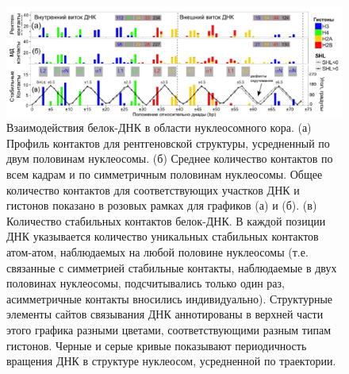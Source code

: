 \begin{figure} [H]
    \centering
    \includegraphics[width=\textwidth]{images/p2/jmb/part2_2_f8.pdf}
    \caption[Взаимодействия белок-ДНК в области нуклеосомного кора]{Взаимодействия белок-ДНК в области нуклеосомного кора. (а) Профиль контактов для рентгеновской структуры, усредненный по двум половинам нуклеосомы. (б) Среднее количество контактов по всем кадрам и по симметричным половинам нуклеосомы. Общее количество контактов для соответствующих участков ДНК и гистонов показано в розовых рамках для графиков (а) и (б). (в) Количество стабильных контактов белок-ДНК. В каждой позиции ДНК указывается количество уникальных стабильных контактов атом-атом, наблюдаемых на любой половине нуклеосомы (т.е. связанные с симметрией стабильные контакты, наблюдаемые в двух половинах нуклеосомы, подсчитывались только один раз, асимметричные контакты вносились индивидуально). Структурные элементы сайтов связывания ДНК аннотированы в верхней части этого графика разными цветами, соответствующими разным типам гистонов. Черные и серые кривые показывают периодичность вращения ДНК в структуре нуклеосом, усредненной по траектории.}
    \label{fig:p2_2_f8}
\end{figure}





